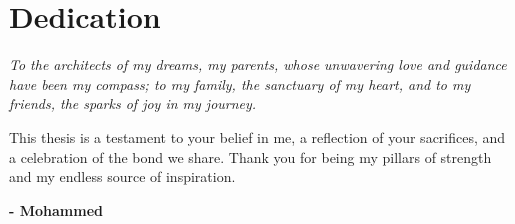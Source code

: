 \chapter*{\hfill Dedication \hfill}

\vspace{3cm}

\noindent
\textit{To the architects of my dreams, my parents, whose unwavering love and guidance have been my compass; to my family, the sanctuary of my heart, and to my friends, the sparks of joy in my journey.}

\noindent
This thesis is a testament to your belief in me, a reflection of your sacrifices, and a celebration of the bond we share. Thank you for being my pillars of strength and my endless source of inspiration.\\

\begin{flushright}
  \textbf{- Mohammed}
\end{flushright}
